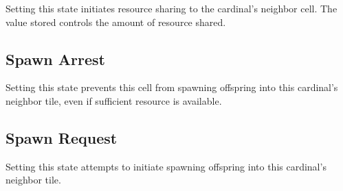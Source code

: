 
Setting this state initiates resource sharing to the cardinal's neighbor cell.
The value stored controls the amount of resource shared.

\subsection{Spawn Arrest}


Setting this state prevents this cell from spawning offspring into this cardinal's neighbor tile, even if sufficient resource is available.

\subsection{Spawn Request}


Setting this state attempts to initiate spawning offspring into this cardinal's neighbor tile.